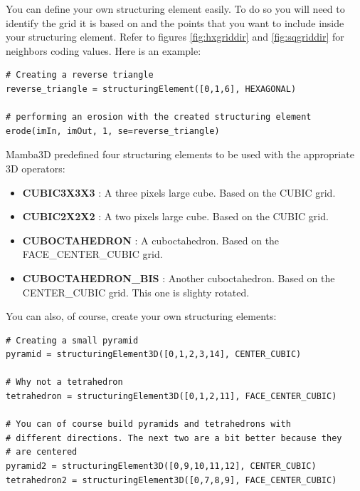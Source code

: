 \documentclass[a4paper,10pt,oneside]{article}
\begin{document}
You can define your own structuring element easily. To do so you will need to
identify the grid it is based on and the points that you want to include 
inside your structuring element. Refer to figures \ref{fig:hxgriddir} and 
\ref{fig:sqgriddir} for neighbors coding values. Here is an example:

\lstset{language=Python}
\begin{lstlisting}
# Creating a reverse triangle
reverse_triangle = structuringElement([0,1,6], HEXAGONAL)

# performing an erosion with the created structuring element
erode(imIn, imOut, 1, se=reverse_triangle)
\end{lstlisting}



Mamba3D predefined four structuring elements to be used with the appropriate
3D operators:

\begin{itemize}
\item \textbf{CUBIC3X3X3} : A three pixels large cube. Based on the CUBIC grid.
\item \textbf{CUBIC2X2X2} : A two pixels large cube. Based on the CUBIC grid.
\item \textbf{CUBOCTAHEDRON} : A cuboctahedron. Based on the
FACE\_CENTER\_CUBIC grid.
\item \textbf{CUBOCTAHEDRON\_BIS} : Another cuboctahedron. Based on the
CENTER\_CUBIC grid. This one is slighty rotated.
\end{itemize}

You can also, of course, create your own structuring elements:

\lstset{language=Python}
\begin{lstlisting}
# Creating a small pyramid
pyramid = structuringElement3D([0,1,2,3,14], CENTER_CUBIC)

# Why not a tetrahedron
tetrahedron = structuringElement3D([0,1,2,11], FACE_CENTER_CUBIC)

# You can of course build pyramids and tetrahedrons with
# different directions. The next two are a bit better because they
# are centered
pyramid2 = structuringElement3D([0,9,10,11,12], CENTER_CUBIC)
tetrahedron2 = structuringElement3D([0,7,8,9], FACE_CENTER_CUBIC)
\end{lstlisting}
\end{document}
